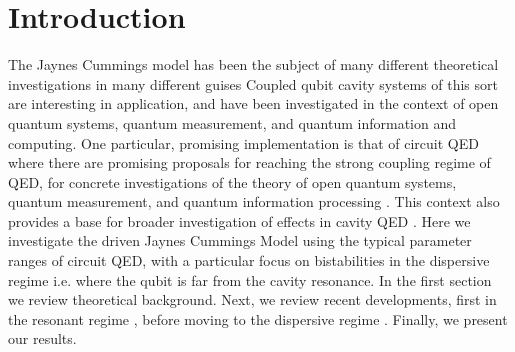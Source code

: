 \section{Introduction}
The Jaynes Cummings model has been the subject of many different theoretical investigations in many different guises
\cite{Abdalla2011}
\cite{Benivegna1994}
Coupled qubit cavity systems of this sort are interesting in application, and have been investigated in the context of open quantum systems, quantum measurement, and quantum information and computing.
One particular, promising implementation is that of circuit QED 
\cite{Blais2004a}
where there are promising proposals for reaching the strong coupling regime of QED, for concrete investigations of the theory of open quantum systems, quantum measurement, and quantum information processing
\cite{You2003}
\cite{Hood2000}
\cite{Irish2003}.
This context also provides a base for broader investigation of effects in cavity QED 
\cite{Al-Saidi2002}
\cite{Plastina2003}
\cite{Marquardt2001}.
Here we investigate the driven Jaynes Cummings Model using the typical parameter ranges of circuit QED, with a particular focus on bistabilities in the dispersive regime i.e.
where the qubit is far from the cavity resonance.
In the first section we review theoretical background.
Next, we review recent developments, first in the resonant regime
\cite{Carmichael2015}, 
before moving to the dispersive regime 
\cite{Bishop2010}.
Finally, we present our results.

